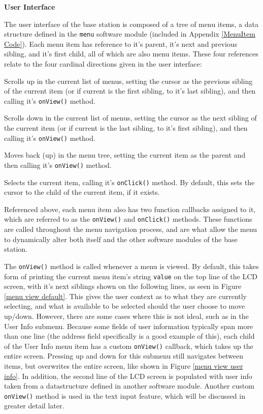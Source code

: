 \documentclass[journal,compsoc]{IEEEtran}
\begin{document}
\textbf{User Interface}

The user interface of the base station is composed of a tree of menu items, a data structure defined in the \lstinline[columns=fixed]{menu} software module (included in Appendix \ref{MenuItem Code}). Each menu item has reference to it's parent, it's next and previous sibling, and it's first child, all of which are also menu items. These four references relate to the four cardinal directions given in the user interface:

\begin{LaTeXdescription}
	\item[Up] Scrolls up in the current list of menus, setting the cursor as the previous sibling of the current item (or if current is the first sibling, to it's last sibling), and then calling it's \lstinline[columns=fixed]{onView()} method.
    \item[Down] Scrolls down in the current list of menus, setting the cursor as the next sibling of the current item (or if current is the last sibling, to it's first sibling), and then calling it's \lstinline[columns=fixed]{onView()} method.
    \item[Left] Moves back (up) in the menu tree, setting the current item as the parent and then calling it's \lstinline[columns=fixed]{onView()} method.
    \item[Right] Selects the current item, calling it's \lstinline[columns=fixed]{onClick()} method. By default, this sets the cursor to the child of the current item, if it exists.
\end{LaTeXdescription}

Referenced above, each menu item also has two function callbacks assigned to it, which are referred to as the \lstinline[columns=fixed]{onView()} and \lstinline[columns=fixed]{onClick()} methods. These functions are called throughout the menu navigation process, and are what allow the menu to dynamically alter both itself and the other software modules of the base station. 

The \lstinline[columns=fixed]{onView()} method is called whenever a menu is viewed. By default, this takes form of printing the current menu item's string \lstinline[columns=fixed]{value} on the top line of the LCD screen, with it's next siblings shown on the following lines, as seen in Figure \ref{menu view default}. This gives the user context as to what they are currently selecting, and what is available to be selected should the user choose to move up/down. However, there are some cases where this is not ideal, such as in the User Info submenu. Because some fields of user information typically span more than one line (the address field specifically is a good example of this), each child of the User Info menu item has a custom \lstinline[columns=fixed]{onView()} callback, which takes up the entire screen. Pressing up and down for this submenu still navigates between items, but overwrites the entire screen, like shown in Figure \ref{menu view user info}. In addition, the second line of the LCD screen is populated with user info taken from a datastructure defined in another software module. Another custom \lstinline[columns=fixed]{onView()} method is used in the text input feature, which will be discussed in greater detail later.
\end{document}
